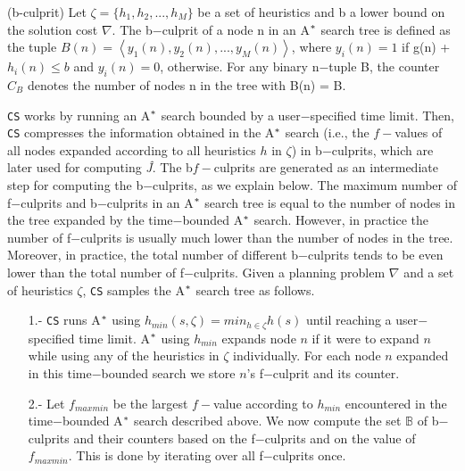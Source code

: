 \begin{definition}(b-culprit)
Let $\zeta = \{h_{1}, h_{2},...,h_{M}\}$ be a set of heuristics and b a lower bound on the solution cost $\nabla$. The b$-$culprit of a node n in an A$\sp{*}$ search tree is defined as the tuple $B(n) = \left\langle y_{1}(n), y_{2}(n),...,y_{M}(n)\right\rangle$, where $y_{i}(n) = 1$ if g(n) + $h_{i}(n) \leq b$ and $y_{i}(n) = 0$, otherwise.  For any binary n$-$tuple B, the counter $C_{B}$ denotes the number of nodes n in the tree with B(n) = B.
\label{def:def_bculprits}
\end{definition}

\texttt{CS} works by running an A$\sp{*}$ search bounded by a user$-$specified time limit. Then, \texttt{CS} compresses the information obtained in the A$\sp{*}$ search (\textsf{i.e.,} the $f-$values of all nodes expanded according to all heuristics $h$ in $\zeta$) in b$-$culprits, which are later used for computing \textit{\^{J}}. The b$f-$culprits are generated as an intermediate step for computing the b$-$culprits, as we explain below. The maximum number of f$-$culprits and b$-$culprits in an A$\sp{*}$ search tree is equal to the number of nodes in the tree expanded by the time$-$bounded A$\sp{*}$ search. However, in practice the number of f$-$culprits is usually much lower than the number of nodes in the tree. Moreover, in practice, the total number of different b$-$culprits tends to be even lower than the total number of f$-$culprits. Given a planning problem $\nabla$ and a set of heuristics $\zeta$, \texttt{CS} samples the A$\sp{*}$ search tree as follows.

\begin{enumerate}
    \item[1.-] \texttt{CS} runs A$\sp{*}$ using $h_{min}(s,\zeta) = min_{h \in \zeta}h(s)$ until reaching a user$-$specified time limit. A$\sp{*}$ using $h_{min}$ expands node $n$ if it were to expand $n$ while using any of the heuristics in $\zeta$ individually. For each node $n$ expanded in this time$-$bounded search we store $n$'s f$-$culprit and its counter.
    \item[2.-] Let $f_{maxmin}$ be the largest $f-$value according to $h_{min}$ encountered in the time$-$bounded A$\sp{*}$ search described above. We now compute the set $\mathbb{B}$ of b$-$culprits and their counters based on the f$-$culprits and on the value of $f_{maxmin}$. This is done by iterating over all f$-$culprits once.\\

\end{enumerate}
    
